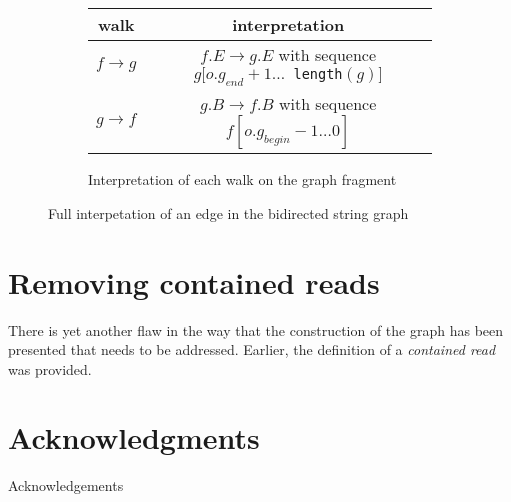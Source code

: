 \documentclass[10pt]{article}
\newcommand{\KeyTerm}[1]{{\it #1}}
\begin{document}
\begin{figure}
	\begin{subfigure}{0.5\textwidth}
		\begin{tabular}{c|c}
			walk & interpretation \\ \hline
			$f \to g$ & $f.E \to g.E$ with sequence $g[o.g_{end} + 1 \dots ${\tt
			length}$(g)]$ \\
			$g \to f$ & $g.B \to f.B$ with sequence $f[o.g_{begin} - 1 \dots 0]$ \\
		\end{tabular}
		\caption{Interpretation of each walk on the graph fragment}
	\end{subfigure}
	\caption{Full interpetation of an edge in the bidirected string graph}
	\label{bidiedge_interp}
\end{figure}

\section{Removing contained reads}

There is yet another flaw in the way that the construction of the graph has been
presented that needs to be addressed.  Earlier, the definition of a
\KeyTerm{contained read} was provided.  


\section*{Acknowledgments}

Acknowledgements



\end{document}
